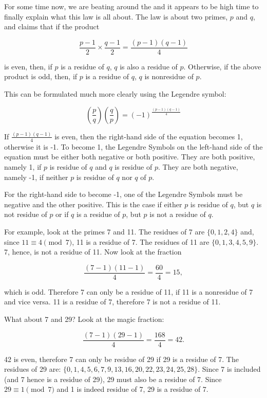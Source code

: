 \documentclass{scrreprt}
\begin{document}
For some time now, we are beating around
the 
and it appears to be high time to finally explain
what this law is all about.
The law is about two primes, $p$ and $q$, and claims
that if the product

\[
  \frac{p-1}{2} \times \frac{q-1}{2} = \frac{(p-1)(q-1)}{4}
\]

is even, then, if $p$ is a residue of $q$,
$q$ is also a residue of $p$.
Otherwise, if the above product is odd,
then, if $p$ is a residue of $q$,
$q$ is nonresidue of $p$.

This can be formulated much more clearly
using the Legendre symbol:

\begin{equation}
\left(\frac{p}{q}\right)
\left(\frac{q}{p}\right) = (-1)^{\frac{(p-1)(q-1)}{4}}
\end{equation}

If $\frac{(p-1)(q-1)}{4}$ is even,
then the right-hand side of the equation
becomes 1, otherwise it is -1.
To become 1, the Legendre Symbols
on the left-hand side of the equation must be 
either both negative or both positive.
They are both positive, namely 1,
if $p$ is residue of $q$ and $q$ is residue of $p$.
They are both negative, namely -1, if
neither $p$ is residue of $q$ nor $q$ of $p$.

For the right-hand side to become -1, 
one of the Legendre Symbols must be negative
and the other positive.
This is the case if either $p$ is residue of $q$,
but $q$ is not residue of $p$ or if $q$ is a residue
of $p$, but $p$ is not a residue of $q$.

For example, look at the primes 7 and 11.
The residues of 7 are $\lbrace 0,1,2,4\rbrace$ and,
since $11 \equiv 4 \pmod{7}$, 11 is a residue of 7.
The residues of 11 are $\lbrace 0,1,3,4,5,9\rbrace$.
7, hence, is not a residue of 11.
Now look at the fraction 

\[
\frac{(7-1)(11-1)}{4} =  \frac{60}{4} = 15,
\]

which is odd. Therefore 7 can only be a residue of 11,
if 11 is a nonresidue of 7 and vice versa.
11 is a residue of 7, therefore 7 is not a residue of 11.

What about 7 and 29? Look at the magic fraction:

\[
\frac{(7-1)(29-1)}{4} =  \frac{168}{4} = 42.
\]

42 is even, therefore 7 can only be residue of 29
if 29 is a residue of 7.
The residues of 29 are: 
$\lbrace 0,1,4,5,6,7,9,13,16,20,22,23,24,25,28\rbrace$.
Since 7 is included (and 7 hence is a residue of 29),
29 must also be a residue of 7.
Since $29 \equiv 1 \pmod{7}$ and 1 is indeed residue of 7,
29 is a residue of 7.
\end{document}
